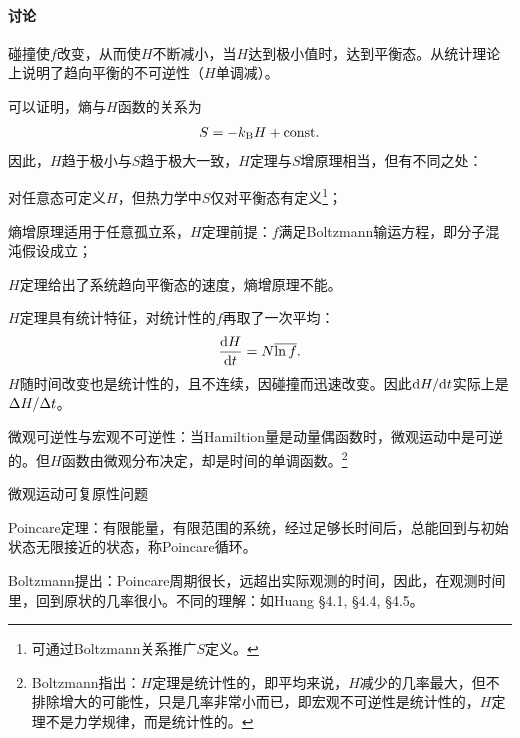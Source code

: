 \paragraph*{讨论}
\begin{compactenum}
	\item 碰撞使$f$改变，从而使$H$不断减小，当$H$达到极小值时，达到平衡态。从统计理论上说明了趋向平衡的不可逆性（$H$单调减）。
	\item 可以证明，熵与$H$函数的关系为
	\begin{align}
		S=-k_{\mathrm B} H+\mathrm{const}.
	\end{align}
	因此，$H$趋于极小与$S$趋于极大一致，$H$定理与$S$增原理相当，但有不同之处：
	\begin{compactitem}
		\item 对任意态可定义$H$，但热力学中$S$仅对平衡态有定义\footnote{可通过Boltzmann关系推广$S$定义。}；
		\item 熵增原理适用于任意孤立系，$H$定理前提：$f$满足Boltzmann输运方程，即分子混沌假设成立；
		\item $H$定理给出了系统趋向平衡态的速度，熵增原理不能。
	\end{compactitem}
	\item $H$定理具有统计特征，对统计性的$f$再取了一次平均：
	\[
		\frac{\mathrm{d}^{\;\!\!}H}{\mathrm{d} t^{\;\!\!}}=N\overline{\ln f}.
	\]
	$H$随时间改变也是统计性的，且不连续，因碰撞而迅速改变。因此$\mathop{}\!\mathrm{d} H/\mathrm{d} t$实际上是$\Delta H/\Delta t$。
	\item 微观可逆性与宏观不可逆性：当Hamiltion量是动量偶函数时，微观运动中是可逆的。但$H$函数由微观分布决定，却是时间的单调函数。\footnote{Boltzmann指出：$H$定理是统计性的，即平均来说，$H$减少的几率最大，但不排除增大的可能性，只是几率非常小而已，即宏观不可逆性是统计性的，$H$定理不是力学规律，而是统计性的。}	
	\item 微观运动可复原性问题
	
	Poincare定理：有限能量，有限范围的系统，经过足够长时间后，总能回到与初始状态无限接近的状态，称Poincare循环。

	Boltzmann提出：Poincare周期很长，远超出实际观测的时间，因此，在观测时间里，回到原状的几率很小。不同的理解：如Huang \S 4.1, \S 4.4, \S 4.5。
\end{compactenum}
